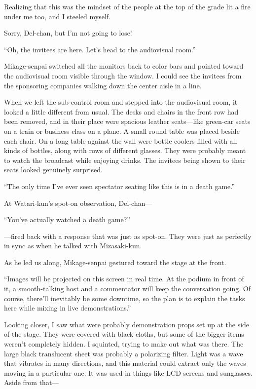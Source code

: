\documentclass[
    a4paper,
    12pt,
    twoside,
    openany,
    UTF8,
    fontset=windows
]{ctexbook}
\begin{document}
Realizing that this was the mindset of the people at the top of the grade lit a fire under me too, and I steeled myself.

Sorry, Del-chan, but I'm not going to lose!

``Oh, the invitees are here. Let's head to the audiovisual room.''

Mikage-senpai switched all the monitors back to color bars and pointed toward the audiovisual room visible through the window. I could see the invitees from the sponsoring companies walking down the center aisle in a line.

When we left the sub-control room and stepped into the audiovisual room, it looked a little different from usual. The desks and chairs in the front row had been removed, and in their place were spacious leather seats---like green-car seats on a train or business class on a plane. A small round table was placed beside each chair. On a long table against the wall were bottle coolers filled with all kinds of bottles, along with rows of different glasses. They were probably meant to watch the broadcast while enjoying drinks. The invitees being shown to their seats looked genuinely surprised.

``The only time I've ever seen spectator seating like this is in a death game.''

At Watari-kun's spot-on observation, Del-chan---

``You've actually watched a death game?''

---fired back with a response that was just as spot-on. They were just as perfectly in sync as when he talked with Mizasaki-kun.

As he led us along, Mikage-senpai gestured toward the stage at the front.

``Images will be projected on this screen in real time. At the podium in front of it, a smooth-talking host and a commentator will keep the conversation going. Of course, there'll inevitably be some downtime, so the plan is to explain the tasks here while mixing in live demonstrations.''

Looking closer, I saw what were probably demonstration props set up at the side of the stage. They were covered with black cloths, but some of the bigger items weren't completely hidden. I squinted, trying to make out what was there. The large black translucent sheet was probably a polarizing filter. Light was a wave that vibrates in many directions, and this material could extract only the waves moving in a particular one. It was used in things like LCD screens and sunglasses. Aside from that---
\end{document}
